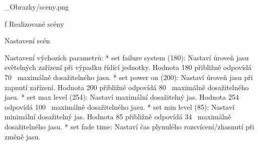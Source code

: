 








\medskip {}
\picw=16cm _Obrazky/sceny.png
\caption/f Realizované scény
\medskip



\sec Nastavení scén


\medskip\noindent
{\sbf Nastavení výchozích parametrů:}
\begitems
    * {\sbf set failure system (180):}
        Nastaví úroveň jasu světelných zařízení při výpadku řídící jednotky.
        Hodnota 180 přibližně odpovídá {70~\pcent} maximálně dosažitelného jasu.
    * {\sbf set power on (200):} Nastaví úroveň jasu při zapnutí zařízení.
        Hodnota 200 přibližně odpovídá {80~\pcent} maximálně dosažitelného jasu.
    * {\sbf set max level (254):} Nastaví maximální dosažitelný jas.
        Hodnota 254 odpovídá {100~\pcent} maximálně dosažitelného jasu.
    * {\sbf set min level (85):} Nastaví minimální dosažitelný jas.
        Hodnota 85 přibližně odpovídá {34~\pcent} maximálně dosažitelného jasu.
    * {\sbf set fade time:} Nastaví čas plynulého rozsvícení/zhasnutí při změně jasu.

